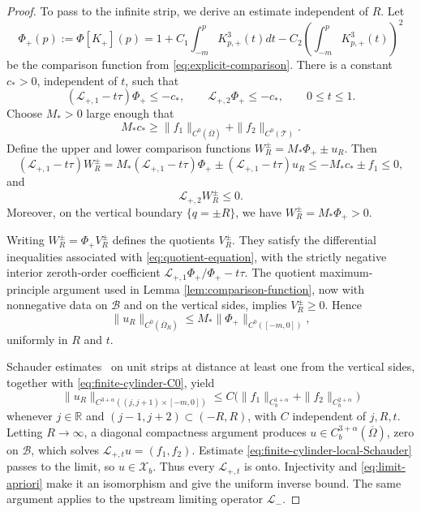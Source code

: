 \documentclass[12pt,letterpaper]{amsart}
\numberwithin{equation}{section}
\def\R{{\mathbb R}}
\begin{document}
\begin{proof}
 {To pass to the infinite strip, we derive an estimate independent of $R$. Let}
 \begin{equation*}
 	\Phi_+(p):=\Phi[K_+](p)=1+C_1\int_{-m}^pK_{p,+}^3(t)dt-C_2\left(\int_{-m}^pK_{p,+}^3(t)\right)^2
 \end{equation*}
 {be the comparison function from \eqref{eq:explicit-comparison}. There is a constant $c_*>0$, independent of $t$, such that}
 \begin{equation*}
 	 ({\mathscr L_{+,1}}-t\tau)\Phi_+\leq-c_*,
 	\qquad {\mathscr L_{+,2}}\Phi_+\leq-c_*,
 	\qquad 0\leq t\leq1.
 \end{equation*}
 {Choose $M_*>0$ large enough that}
 \begin{equation*}
 	M_*c_*\geq \|f_1\|_{C^0(\overline\Omega)}+\|f_2\|_{C^0(\mathcal T)}.
 \end{equation*}
 {Define the upper and lower comparison functions $W_R^\pm=M_*\Phi_+\pm u_R$. Then}
 \begin{equation*}
	(\mathscr{L}_{+,1}-t\tau)W_{R}^{\pm}={M_*(\mathscr L_{+,1}-t\tau)\Phi_+\pm(\mathscr L_{+,1}-t\tau)u_R}\leq -M_* c_* \pm f_1 \leq 0,
 \end{equation*}
 and
  \begin{equation*}
 	\mathscr{L}_{+,2}W_{R}^{\pm}\leq 0.
 \end{equation*}
	 Moreover, on the vertical boundary $\{q=\pm R\}$, we have $W^\pm_{R}={M_*\Phi_+}>0$.

 {Writing $W_R^\pm=\Phi_+V_R^\pm$ defines the quotients $V_R^\pm$. They satisfy the differential inequalities associated with \eqref{eq:quotient-equation}, with the strictly negative interior zeroth-order coefficient $\mathscr L_{+,1}\Phi_+/\Phi_+-t\tau$.} {The quotient maximum-principle argument used in Lemma \ref{lem:comparison-function}, now with nonnegative data on $\mathcal B$ and on the vertical sides,} implies $V_R^{\pm}\geq0$. Hence
\begin{equation}\label{eq:finite-cylinder-C0}
	\|u_R\|_{C^0(\overline\Omega_R)}
	\le M_*\|\Phi_+\|_{C^0([-m,0])},
\end{equation}
 uniformly in $R$ and $t$.

 {Schauder estimates~\cite{Ts} on unit strips at distance at least one from the vertical sides, together with \eqref{eq:finite-cylinder-C0}, yield}
 \begin{equation}\label{eq:finite-cylinder-local-Schauder}
 	\|u_R\|_{C^{3+\alpha}((j,j+1)\times[-m,0])}
 	\le C\bigl(\|f_1\|_{C_b^{1+\alpha}}
 	+\|f_2\|_{C_b^{2+\alpha}}\bigr)
 \end{equation}
	 whenever \(j\in\R\) and \((j-1,j+2)\subset(-R,R)\), with \(C\) independent of
	 \(j,R,t\).  Letting \(R\to\infty\), a diagonal compactness argument produces
 \(u\in C_b^{3+\alpha}(\overline\Omega)\), zero on \(\mathcal B\), which solves
 \({\mathscr L_{+,t}}u=(f_1,f_2)\).  Estimate
 \eqref{eq:finite-cylinder-local-Schauder} passes to the limit, so
 \(u\in\mathscr X_b\).  Thus every \({\mathscr L_{+,t}}\) is onto.  Injectivity and
 \eqref{eq:limit-apriori} make it an isomorphism and give the uniform inverse
 bound.    {The same argument applies to the upstream limiting operator $\mathscr L_-$.}
\end{proof}
	
\end{document}
